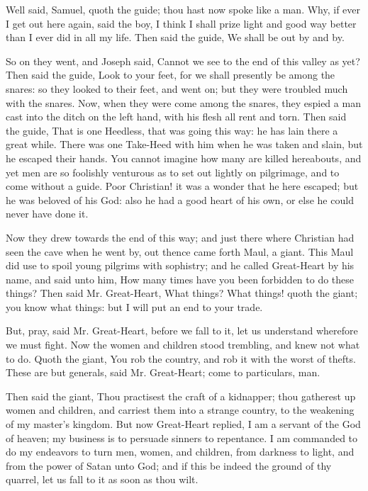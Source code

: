 Well said, Samuel, quoth the guide; thou hast now spoke like a man. Why, if ever I get out here again, said the boy, I think I shall prize light and good way better than I ever did in all my life. Then said the guide, We shall be out by and by.

So on they went, and Joseph said, Cannot we see to the end of this valley as yet? Then said the guide, Look to your feet, for we shall presently be among the snares: so they looked to their feet, and went on; but they were troubled much with the snares. Now, when they were come among the snares, they espied a man cast into the ditch on the left hand, with his flesh all rent and torn. Then said the guide, That is one Heedless, that was going this way: he has lain there a great while. There was one Take-Heed with him when he was taken and slain, but he escaped their hands. You cannot imagine how many are killed hereabouts, and yet men are so foolishly venturous as to set out lightly on pilgrimage, and to come without a guide. Poor Christian! it was a wonder that he here escaped; but he was beloved of his God: also he had a good heart of his own, or else he could never have done it.

Now they drew towards the end of this way; and just there where Christian had seen the cave when he went by, out thence came forth Maul, a giant. This Maul did use to spoil young pilgrims with sophistry; and he called Great-Heart by his name, and said unto him, How many times have you been forbidden to do these things? Then said Mr. Great-Heart, What things? What things! quoth the giant; you know what things: but I will put an end to your trade.

But, pray, said Mr. Great-Heart, before we fall to it, let us understand wherefore we must fight. Now the women and children stood trembling, and knew not what to do. Quoth the giant, You rob the country, and rob it with the worst of thefts. These are but generals, said Mr. Great-Heart; come to particulars, man.

Then said the giant, Thou practisest the craft of a kidnapper; thou gatherest up women and children, and carriest them into a strange country, to the weakening of my master's kingdom. But now Great-Heart replied, I am a servant of the God of heaven; my business is to persuade sinners to repentance. I am commanded to do my endeavors to turn men, women, and children, from darkness to light, and from the power of Satan unto God; and if this be indeed the ground of thy quarrel, let us fall to it as soon as thou wilt.

